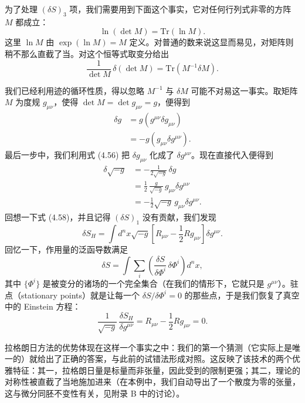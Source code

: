 为了处理 $(\delta S)_3$ 项，我们需要用到下面这个事实，它对任何行列式非零的方阵 $M$ 都成立：
\begin{equation*}
\ln(\det M) = \mathrm{Tr}(\ln M).
\tag{4.66}
\end{equation*}
这里 $\ln M$ 由 $\exp(\ln M)=M$ 定义。对普通的数来说这显而易见，对矩阵则稍不那么直截了当。对这个恒等式取变分给出
\begin{equation*}
\frac{1}{\det M}\,\delta(\det M) = \mathrm{Tr}(M^{-1}\delta M).
\tag{4.67}
\end{equation*}

我们已经利用迹的循环性质，得以忽略 $M^{-1}$ 与 $\delta M$ 可能不对易这一事实。取矩阵 $M$ 为度规 $g_{\mu\nu}$，使得 $\det M=\det g_{\mu\nu}=g$，便得到
\begin{align*}
\delta g &= g\left(g^{\mu\nu}\delta g_{\mu\nu}\right)\\
&= -g\left(g_{\mu\nu}\delta g^{\mu\nu}\right). \tag{4.68}
\end{align*}
最后一步中，我们利用式 (4.56) 把 $\delta g_{\mu\nu}$ 化成了 $\delta g^{\mu\nu}$。现在直接代入便得到
\begin{align*}
\delta\sqrt{-g} &= -\frac{1}{2\sqrt{-g}}\,\delta g\\
&= \frac{1}{2}\,\frac{g}{\sqrt{-g}}\,g_{\mu\nu}\delta g^{\mu\nu}\\
&= -\frac{1}{2}\sqrt{-g}\,g_{\mu\nu}\delta g^{\mu\nu}. \tag{4.69}
\end{align*}
回想一下式 (4.58)，并且记得 $(\delta S)_1$ 没有贡献，我们发现
\begin{equation*}
\delta S_H = \int d^nx\sqrt{-g}\left[R_{\mu\nu}-\frac{1}{2}Rg_{\mu\nu}\right]\delta g^{\mu\nu}.
\tag{4.70}
\end{equation*}
回忆一下，作用量的泛函导数满足
\begin{equation*}
\delta S = \int\sum_i\left(\frac{\delta S}{\delta\Phi^i}\,\delta\Phi^i\right)d^nx,
\tag{4.71}
\end{equation*}
其中 $\{\Phi^i\}$ 是被变分的诸场的一个完全集合（在我们的情形下，它就只是 $g^{\mu\nu}$）。驻点（stationary points）就是让每一个 $\delta S/\delta\Phi^i=0$ 的那些点，于是我们恢复了真空中的 Einstein 方程：
\begin{equation*}
\frac{1}{\sqrt{-g}}\,\frac{\delta S_H}{\delta g^{\mu\nu}} = R_{\mu\nu}-\frac{1}{2}Rg_{\mu\nu} = 0.
\tag{4.72}
\end{equation*}

拉格朗日方法的优势体现在这样一个事实之中：我们的第一个猜测（它实际上是唯一的）就给出了正确的答案，与此前的试错法形成对照。这反映了该技术的两个优雅特征：其一，拉格朗日量是标量而非张量，因此受到的限制更强；其二，理论的对称性被直截了当地施加进来（在本例中，我们自动导出了一个散度为零的张量，这与微分同胚不变性有关，见附录 B 中的讨论）。

